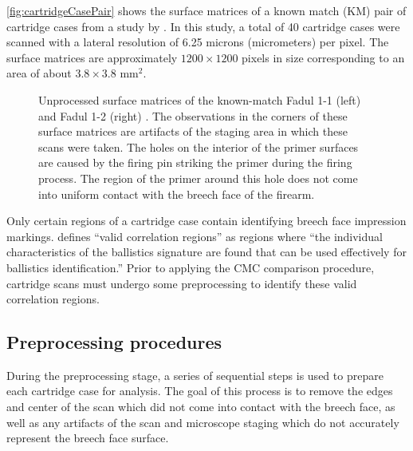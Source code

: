 \autoref{fig:cartridgeCasePair} shows the surface matrices of a known
match (KM) pair of cartridge cases from a study by
\citet{fadul_empirical_2011}. In this study, a total of 40 cartridge
cases were scanned with a lateral resolution of 6.25 microns
(micrometers) per pixel. The surface matrices are approximately
\(1200 \times 1200\) pixels in size corresponding to an area of about
\(3.8 \times 3.8\) mm\(^2\).

\begin{Schunk}
\begin{figure}[htbp]

{\centering {}

}

\caption{\label{fig:cartridgeCasePair} Unprocessed surface matrices of the known-match Fadul 1-1 (left) and Fadul 1-2 (right) \citep{fadul_empirical_2011}. The observations in the corners of these surface matrices are artifacts of the staging area in which these scans were taken. The holes on the interior of the primer surfaces are caused by the firing pin striking the primer during the firing process. The region of the primer around this hole does not come into uniform contact with the breech face of the firearm.}\label{fig:rawBFs}
\end{figure}
\end{Schunk}

Only certain regions of a cartridge case contain identifying breech face
impression markings. \citet{song_proposed_2013} defines ``valid
correlation regions'' as regions where ``the individual characteristics
of the ballistics signature are found that can be used effectively for
ballistics identification.'' Prior to applying the CMC comparison
procedure, cartridge scans must undergo some preprocessing to identify
these valid correlation regions.

\hypertarget{preProcessing}{%
\subsection{Preprocessing procedures}\label{preProcessing}}

During the preprocessing stage, a series of sequential steps is used to
prepare each cartridge case for analysis. The goal of this process is to
remove the edges and center of the scan which did not come into contact
with the breech face, as well as any artifacts of the scan and
microscope staging which do not accurately represent the breech face
surface.

